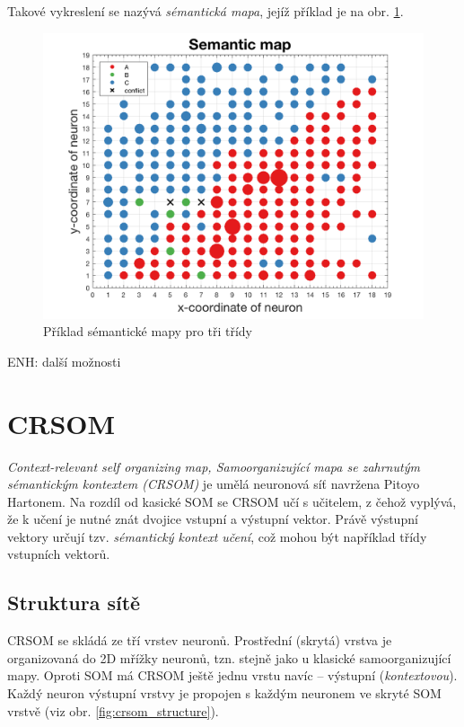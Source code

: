 \documentclass[thesis=M,czech]{FITthesis}[2012/06/26]
\begin{document}
Takové vykreslení se nazývá \textit{sémantická mapa}, jejíž příklad je na obr. \ref{fig:semanticmap}.


\begin{figure}[htbp]
\begin{center}
	\includegraphics[scale=0.3]{exp_sem_map.png}
\caption{Příklad sémantické mapy pro tři třídy}
\label{fig:semanticmap}
\end{center}
\end{figure}


ENH: další možnosti



\section{CRSOM}\label{sec:crsom_teo}
\textit{Context-relevant self organizing map, Samoorganizující mapa se zahrnutým sémantickým kontextem (CRSOM)} je umělá neuronová síť navržena Pitoyo Hartonem. Na rozdíl od kasické SOM se CRSOM učí s učitelem, z čehož vyplývá, že k učení je nutné znát dvojice vstupní a výstupní vektor. Právě výstupní vektory určují tzv. \textit{sémantický kontext učení}, což mohou být například třídy vstupních vektorů.

\subsection{Struktura sítě}
CRSOM se skládá ze tří vrstev neuronů. Prostřední (skrytá) vrstva je organizovaná do 2D mřížky neuronů, tzn. stejně jako u klasické samoorganizující mapy.
 Oproti SOM má CRSOM ještě jednu vrstu navíc -- výstupní (\textit{kontextovou}).  Každý neuron výstupní vrstvy je propojen s každým neuronem ve skryté SOM vrstvě (viz obr. \ref{fig:crsom_structure}). 
 
\end{document}
